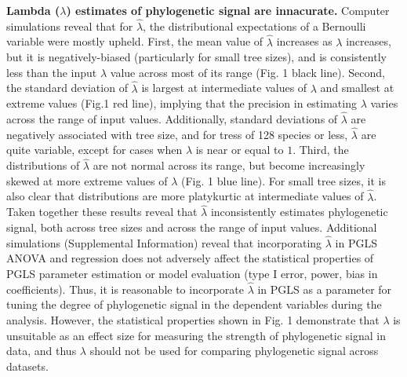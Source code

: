 \documentclass[9pt,twocolumn,twoside,lineno]{pnas-new}
\begin{document}
\textbf{Lambda (\(\lambda\)) estimates of phylogenetic signal are
innacurate.} Computer simulations reveal that for \(\hat{\lambda}\), the
distributional expectations of a Bernoulli variable were mostly upheld.
First, the mean value of \(\hat{\lambda}\) increases as \(\lambda\)
increases, but it is negatively-biased (particularly for small tree
sizes), and is consistently less than the input \(\lambda\) value across
most of its range (Fig. 1 black line). Second, the standard deviation of
\(\hat{\lambda}\) is largest at intermediate values of \(\lambda\) and
smallest at extreme values (Fig.1 red line), implying that the precision
in estimating \(\lambda\) varies across the range of input values.
Additionally, standard deviations of \(\hat{\lambda}\) are negatively
associated with tree size, and for tress of 128 species or less,
\(\hat{\lambda}\) are quite variable, except for cases when \(\lambda\)
is near or equal to \(1\). Third, the distributions of \(\hat{\lambda}\)
are not normal across its range, but become increasingly skewed at more
extreme values of \(\lambda\) (Fig. 1 blue line). For small tree sizes,
it is also clear that distributions are more platykurtic at intermediate
values of \(\hat{\lambda}\). Taken together these results reveal that
\(\hat\lambda\) inconsistently estimates phylogenetic signal, both
across tree sizes and across the range of input values. Additional
simulations (Supplemental Information) reveal that incorporating
\(\hat\lambda\) in PGLS ANOVA and regression does not adversely affect
the statistical properties of PGLS parameter estimation or model
evaluation (type I error, power, bias in coefficients). Thus, it is
reasonable to incorporate \(\hat\lambda\) in PGLS as a parameter for
tuning the degree of phylogenetic signal in the dependent variables
during the analysis. However, the statistical properties shown in Fig. 1
demonstrate that \(\lambda\) is unsuitable as an effect size for
measuring the strength of phylogenetic signal in data, and thus
\(\lambda\) should not be used for comparing phylogenetic signal across
datasets.
\end{document}
